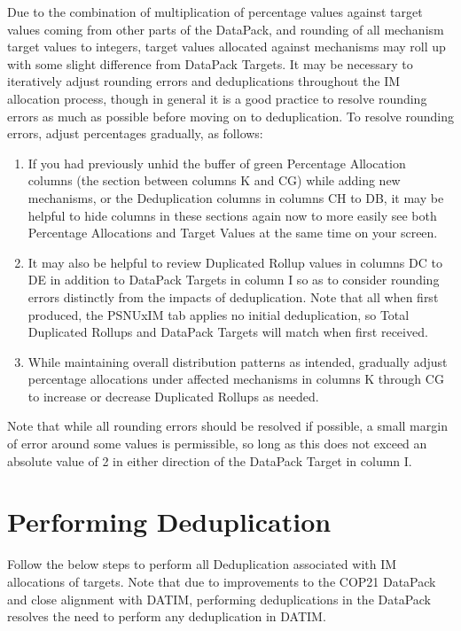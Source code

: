 \documentclass[
  openany]{book}
\begin{document}
Due to the combination of multiplication of percentage values against
target values coming from other parts of the DataPack, and rounding of
all mechanism target values to integers, target values allocated against
mechanisms may roll up with some slight difference from DataPack
Targets. It may be necessary to iteratively adjust rounding errors and
deduplications throughout the IM allocation process, though in general
it is a good practice to resolve rounding errors as much as possible
before moving on to deduplication. To resolve rounding errors, adjust
percentages gradually, as follows:

\begin{enumerate}
\def\labelenumi{\arabic{enumi})}
\item
  If you had previously unhid the buffer of green Percentage
  Allocation columns (the section between columns K and CG) while
  adding new mechanisms, or the Deduplication columns in columns CH to
  DB, it may be helpful to hide columns in these sections again now to
  more easily see both Percentage Allocations and Target Values at the
  same time on your screen.
\item
  It may also be helpful to review Duplicated Rollup values in columns
  DC to DE in addition to DataPack Targets in column I so as to
  consider rounding errors distinctly from the impacts of
  deduplication. Note that all when first produced, the PSNUxIM tab
  applies no initial deduplication, so Total Duplicated Rollups and
  DataPack Targets will match when first received.
\item
  While maintaining overall distribution patterns as intended,
  gradually adjust percentage allocations under affected mechanisms in
  columns K through CG to increase or decrease Duplicated Rollups as
  needed.
\end{enumerate}

Note that while all rounding errors should be resolved if possible, a
small margin of error around some values is permissible, so long as this
does not exceed an absolute value of 2 in either direction of the
DataPack Target in column I.

\hypertarget{performing-deduplication}{%
\section{Performing Deduplication}\label{performing-deduplication}}

Follow the below steps to perform all Deduplication associated with IM
allocations of targets. Note that due to improvements to the COP21
DataPack and close alignment with DATIM, performing deduplications in
the DataPack resolves the need to perform any deduplication in DATIM.
\end{document}
